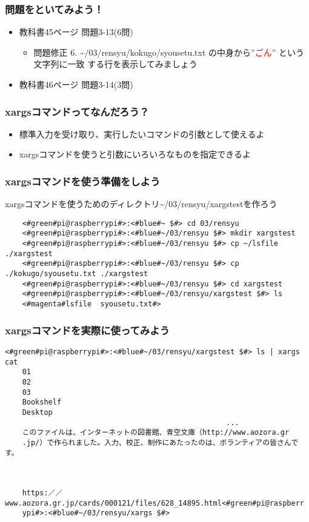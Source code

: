 \begin{frame}
    \frametitle{問題をといてみよう！}
    \begin{itemize}
        \item 教科書45ページ 問題3-13(6問)
        \begin{itemize}
            \item 問題修正 6. \textasciitilde/03/rensyu/kokugo/syousetu.txt の中身から”\textcolor{red}{ごん}” という文字列に一致
            する行を表示してみましょう
        \end{itemize}
        \item 教科書46ページ 問題3-14(3問)
    \end{itemize}
\end{frame}

\begin{frame}
    \frametitle{xargsコマンドってなんだろう？}
    \begin{itemize}
        \item 標準入力を受け取り、実行したいコマンドの引数として使えるよ
        \item xargsコマンドを使うと引数にいろいろなものを指定できるよ
    \end{itemize}
    \begin{figure}
        \centering
        
    \end{figure}
\end{frame}

\begin{frame}[fragile]
    \frametitle{xargsコマンドを使う準備をしよう}
    xargsコマンドを使うためのディレクトリ\textasciitilde/03/rensyu/xargstestを作ろう
    \begin{lstlisting}
    <#green#pi@raspberrypi#>:<#blue#~ $#> cd 03/rensyu
    <#green#pi@raspberrypi#>:<#blue#~/03/rensyu $#> mkdir xargstest
    <#green#pi@raspberrypi#>:<#blue#~/03/rensyu $#> cp ~/lsfile ./xargstest
    <#green#pi@raspberrypi#>:<#blue#~/03/rensyu $#> cp ./kokugo/syousetu.txt ./xargstest
    <#green#pi@raspberrypi#>:<#blue#~/03/rensyu $#> cd xargstest
    <#green#pi@raspberrypi#>:<#blue#~/03/rensyu/xargstest $#> ls
    <#magenta#lsfile  syousetu.txt#>
    \end{lstlisting}
\end{frame}

\begin{frame}[fragile]
    \frametitle{xargsコマンドを実際に使ってみよう}
    \begin{lstlisting}[title=xargsコマンドを使ってcatコマンドを使う]
    <#green#pi@raspberrypi#>:<#blue#~/03/rensyu/xargstest $#> ls | xargs cat
    01
    02
    03
    Bookshelf
    Desktop
                                                   ...
    このファイルは、インターネットの図書館、青空文庫（http://www.aozora.gr
    .jp/）で作られました。入力、校正、制作にあたったのは、ボランティアの皆さんです。
        
        
        
    https:／／www.aozora.gr.jp/cards/000121/files/628_14895.html<#green#pi@raspberr
    ypi#>:<#blue#~/03/rensyu/xargs $#>
    \end{lstlisting}
\end{frame}

